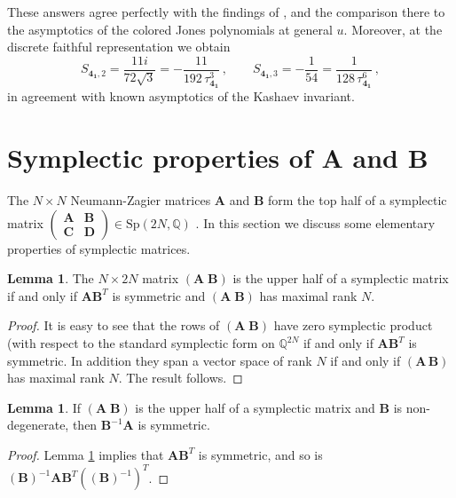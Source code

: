 \documentclass[12pt]{amsart}
\newcommand{\lbl}{\label}
\theoremstyle{definition}
\newtheorem{lemma}[theorem]{Lemma}
\def\be{  \begin{equation} }
\def\ee{  \end{equation} }
\def\Sp{\mathrm{Sp}}
\newcommand{\mb}{\mathbf}
\numberwithin{equation}{section}
\begin{document}
These answers agree perfectly with the findings of \cite{DGLZ}, and the comparison there to the asymptotics of the colored Jones polynomials at general $u$. Moreover, at the discrete faithful representation we obtain
%
\be S_{\mb {4_1},2} = \frac{11i}{72\sqrt{3}}= -\frac{11}{192\,\tau_{\mb{4_1}}^{3}}\,,\qquad S_{\mb{4_1},3}=-\frac1{54} = \frac{1}{128\,\tau_{\mb{4_1}}^{6}}\,,\ee
%
in agreement with known asymptotics of the Kashaev invariant.


\appendix



\section{Symplectic properties of A and B}
\lbl{app.symp}


The $N\times N$ Neumann-Zagier matrices $\mb A$ and $\mb B$ form the top 
half of a symplectic matrix 
$\left(\begin{smallmatrix} \mb A & \mb B  \\ \mb C & \mb D 
\end{smallmatrix}\right) \in \Sp(2N,\mathbb Q)$ \cite{NZ}. In this section
we discuss some elementary properties of symplectic matrices.

\begin{lemma}
\lbl{lem.halfAB}
The $N \times 2N$ matrix $(\mb A \; \mb B)$ is the upper half of a 
symplectic matrix if and only if 
$\mb A \mb B^T$ is symmetric and $(\mb A \; \mb B)$ has maximal rank $N$.
\end{lemma}

\begin{proof}
It is easy to see that the rows of $(\mb A \; \mb B)$ have zero symplectic 
product (with respect to the standard symplectic form on $\mathbb{Q}^{2N}$
if and only if $\mb A \mb B^T$ is symmetric. In addition they span a vector
space of rank $N$ if and only if $(\mb A \, \mb B)$ has maximal rank $N$.
The result follows.
\end{proof}


\begin{lemma}
\lbl{lemma.BA}
If $(\mb A\;\mb B)$ is the upper half of a symplectic matrix and 
$\mb B$ is non-degenerate, then $\mb B^{-1}\mb A$ is symmetric.
\end{lemma}


\begin{proof}
Lemma \ref{lem.halfAB} implies that $\mb A \mb B^T$ is symmetric, and 
so is $(\mb B)^{-1} \mb A \mb B^T  ((\mb B)^{-1})^T$.
\end{proof}  
  
\end{document}
